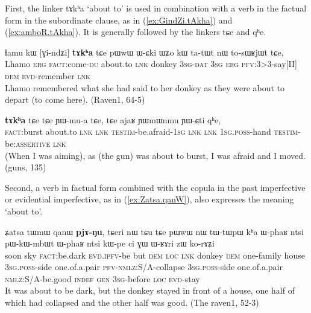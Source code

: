 \documentclass[oldfontcommands,oneside,a4paper,11pt]{article}
\newcommand{\ipa}[1]{{\phon \mbox{#1}}} %
\newcommand{\refb}[1]{(\ref{#1})}
\begin{document}
First, the linker \ipa{tɤkʰa} `about to'  is used in combination with a verb in the factual form in the subordinate clause, as in \refb{ex:GindZi.tAkha} and \refb{ex:amboR.tAkha}. It is generally followed by the linkers \ipa{tɕe} and \ipa{qʰe}. 
     \begin{exe}
\ex \label{ex:GindZi.tAkha}
\gll
\ipa{ɬamu}   	\ipa{kɯ}   	[\ipa{ɣi-ndʑi}]   	\textbf{\ipa{tɤkʰa}}   	\ipa{tɕe}   	\ipa{pɯwɯ}   	\ipa{ɯ-ɕki}   	\ipa{ɯʑo}   	\ipa{kɯ}   	\ipa{ta-tɯt}   	\ipa{nɯ}   	\ipa{to-sɯʁjɯt}   	\ipa{tɕe,}   	\\
Lhamo \textsc{erg} \textsc{fact}:come-\textsc{du} about.to \textsc{lnk} donkey \textsc{3sg-dat} \textsc{3sg} \textsc{erg} \textsc{pfv}:3>3-say[II] \textsc{dem} \textsc{evd}-remember \textsc{lnk} \\
\glt  Lhamo remembered what she had said to her donkey as they were about to depart (to come here). (Raven1, 64-5)
\end{exe}

     \begin{exe}
\ex \label{ex:amboR.tAkha}
\gll
[\ipa{amboʁ}]   	\textbf{\ipa{tɤkʰa}}   	\ipa{tɕe}   	\ipa{tɕe}   	\ipa{ɲɯ-mu-a}   	\ipa{tɕe,}   	\ipa{tɕe}   	\ipa{ajaʁ}   	\ipa{ɲɯmɯnmu}   	\ipa{ɲɯ-ɕti}   	\ipa{qʰe,}   \\
\textsc{fact}:burst  about.to \textsc{lnk}  \textsc{lnk} \textsc{testim}-be.afraid-\textsc{1sg}  \textsc{lnk}  \textsc{lnk} \textsc{1sg.poss}-hand \textsc{testim}-be:\textsc{assertive} \textsc{lnk} \\
\glt  (When I was aiming), as (the gun) was about to burst, I was afraid and I moved. (guns, 135)
\end{exe}




 
Second,  a verb in factual form combined with the copula in the past imperfective or evidential imperfective, as in \refb{ex:Zatsa.qanW}, also expresses the meaning `about to'.
     \begin{exe}
\ex \label{ex:Zatsa.qanW}
\gll
\ipa{ʑatsa}  	\ipa{tɯmɯ}  	\ipa{qanɯ}  	\ipa{\textbf{pjɤ-ŋu},}  	\ipa{tɕeri}  	\ipa{nɯ} \ipa{tɕu}  	\ipa{tɕe}  	\ipa{pɯwɯ}  	\ipa{nɯ}  	\ipa{tɯ-tɯpɯ}  	\ipa{kʰa}  	\ipa{ɯ-phaʁ}  	\ipa{ntsi}  	\ipa{pɯ-kɯ-mbɯt}  	\ipa{ɯ-phaʁ}  	\ipa{ntsi}  	\ipa{kɯ-pe}  	\ipa{ci}  	\ipa{ɣɯ}   	\ipa{ɯ-ʁɤri}  	\ipa{zɯ}  	\ipa{ko-rɤʑi}  \\
soon sky \textsc{fact}:be.dark \textsc{evd.ipfv}-be but \textsc{dem} \textsc{loc} \textsc{lnk} donkey \textsc{dem} one-family house \textsc{3sg.poss}-side one.of.a.pair \textsc{pfv-nmlz}:S/A-collapse  \textsc{3sg.poss}-side one.of.a.pair \textsc{nmlz}:S/A-be.good \textsc{indef}   \textsc{gen} \textsc{3sg}-before \textsc{loc} \textsc{evd}-stay \\
\glt It was about to be dark, but the donkey stayed in front of a house, one half of which had collapsed and the other half was good. (The raven1, 52-3)
 \end{exe}
\end{document}
